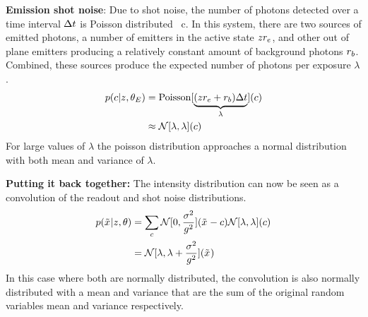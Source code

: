 \textbf{Emission shot noise}:
  Due to shot noise, the number of photons detected over a time interval $\Delta t$ is Poisson
  distributed~\cite{mehta_poisson_2016} c. In this system, there are two sources of emitted photons, a number of emitters in the active state $z_{}r_e$,
  and other out of plane emitters producing a relatively constant amount of background photons $r_b$. Combined, 
  these sources produce the expected number of photons per exposure $\lambda$.
  \begin{align}
    p(c|z_{},\theta_E)
      &= \operatorname{Poisson}[\underbrace{(z_{}r_e + r_b)\Delta t}_{\lambda}](c) \\
      &\approx \mathcal{N}[\lambda, \lambda](c)
  \end{align}
  For large values of $\lambda$ the poisson distribution approaches a normal distribution with both mean and variance of $\lambda$.

\textbf{Putting it back together:}
The intensity distribution can now be seen as a convolution of the readout and shot noise distributions.
  \begin{align}
    p(\tilde{x}_{}|z_{},\theta)
      &= \sum_c
        \mathcal{N}[0, \frac{\sigma^2}{g^2}](\tilde{x}_{} - c)
        \mathcal{N}[\lambda, \lambda](c) \\
      &= \mathcal{N}[\lambda, \lambda + \frac{\sigma^2}{g^2}](\tilde{x}_{})
  \end{align}
  In this case where both are normally distributed, the convolution is also normally distributed with 
  a mean and variance that are the sum of the original random variables mean and variance respectively. 

